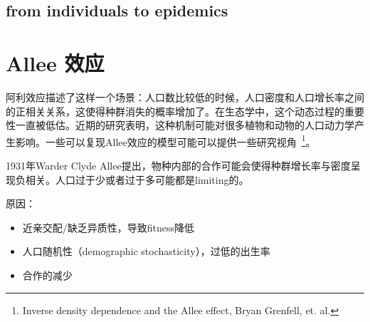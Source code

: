 \subsection{from individuals to epidemics}

\section{Allee 效应}

阿利效应描述了这样一个场景：人口数比较低的时候，人口密度和人口增长率之间的正相关关系，这使得种群消失的概率增加了。在生态学中，这个动态过程的重要性一直被低估。近期的研究表明，这种机制可能对很多植物和动物的人口动力学产生影响。一些可以复现Allee效应的模型可能可以提供一些研究视角~\footnote{Inverse density dependence and the Allee effect, Bryan Grenfell, et. al.}。

1931年Warder Clyde Allee提出，物种内部的合作可能会使得种群增长率与密度呈现负相关。人口过于少或者过于多可能都是limiting的。

原因：\begin{itemize}
    \item 近亲交配/缺乏异质性，导致fitness降低
    \item 人口随机性（demographic stochasticity），过低的出生率
    \item 合作的减少
\end{itemize}